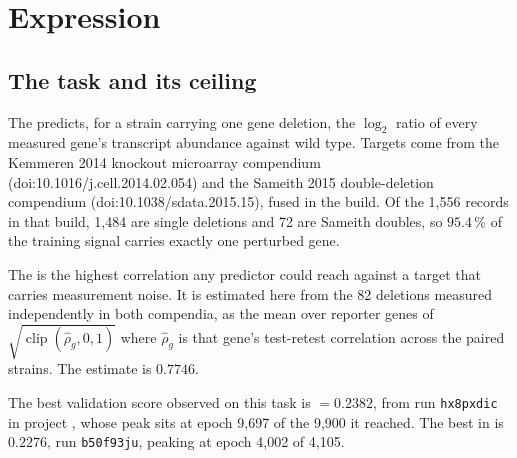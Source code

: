 
\section{Expression}
\label{sec:expression}

\subsection{The task and its ceiling}

The  predicts, for a strain carrying one gene deletion, the
$\log_2$ ratio of every measured gene's transcript abundance against wild type. Targets
come from the Kemmeren 2014 knockout microarray compendium (doi:10.1016/j.cell.2014.02.054)
and the Sameith 2015 double-deletion compendium (doi:10.1038/sdata.2015.15), fused in the
 build. Of the 1,556 records in that build, 1,484 are single deletions and
72 are Sameith doubles, so $95.4\,\%$ of the training signal carries exactly one perturbed
gene.

The  is the highest correlation any predictor could reach
against a target that carries measurement noise. It is estimated here from the 82 deletions
measured independently in both compendia, as the mean over reporter genes of
$\sqrt{\operatorname{clip}(\hat\rho_g, 0, 1)}$ where $\hat\rho_g$ is that gene's test-retest
correlation across the paired strains. The estimate is $\mathbf{0.7746}$.

The best validation score observed on this task is
 $= \mathbf{0.2382}$, from run \texttt{hx8pxdic} in project
, whose peak sits at epoch 9,697 of the 9,900 it reached.
The best in  is $0.2276$, run \texttt{b50f93ju}, peaking at
epoch 4,002 of 4,105.

